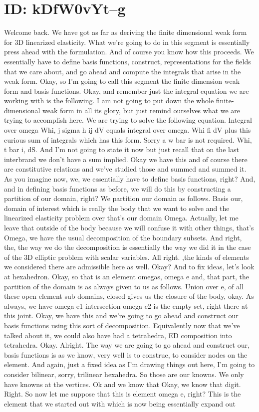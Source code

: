 \documentclass[10pt]{article}
\begin{document}
\section*{ID: kDfW0vYt--g}
Welcome back. We have got as far as deriving the finite dimensional weak form for 3D linearized elasticity. What we're going to do in this segment is essentially press ahead with the formulation. And of course you know how this proceeds. We essentially have to define basis functions, construct, representations for the fields that we care about, and go ahead and compute the integrals that arise in the weak form. Okay, so I'm going to call this segment the finite dimension weak form and basis functions. Okay, and remember just the integral equation we are working with is the following. I am not going to put down the whole finite-dimensional weak form in all its glory, but just remind ourselves what we are trying to accomplish here. We are trying to solve the following equation. Integral over omega Whi, j sigma h ij dV equals integral over omega. Whi fi dV plus this curious sum of integrals which has this form. Sorry a w bar is not required. Whi, t bar i, dS. And I'm not going to state it now but just recall that on the last interbrand we don't have a sum implied. Okay we have this and of course there are constitutive relations and we've studied those and summed and summed it. As you imagine now, we, we essentially have to define basis functions, right? And, and in defining basis functions as before, we will do this by constructing a partition of our domain, right? We partition our domain as follows. Basis our, domain of interest which is really the body that we want to solve and the linearized elasticity problem over that's our domain Omega. Actually, let me leave that outside of the body because we will confuse it with other things, that's Omega, we have the usual decomposition of the boundary subsets. And right, the, the way we do the decomposition is essentially the way we did it in the case of the 3D elliptic problem with scalar variables. All right. ,the kinds of elements we considered there are admissible here as well. Okay? And to fix ideas, let's look at hexahedron. Okay, so that is an element omegas, omega e and, that part, the partition of the domain is as always given to us as follows. Union over e, of all these open element sub domains, closed gives us the closure of the body, okay. As always, we have omega e1 intersection omega e2 is the empty set, right there at this joint. Okay, we have this and we're going to go ahead and construct our basis functions using this sort of decomposition. Equivalently now that we've talked about it, we could also have had a tetrahedra, ED composition into tetrahedra. Okay. Alright. The way we are going to go ahead and construct our, basis functions is as we know, very well is to construe, to consider nodes on the element. And again, just a fixed idea as I'm drawing things out here, I'm going to consider bilinear, sorry, trilinear hexahedra. So those are our knowns. We only have knowns at the vertices. Ok and we know that Okay, we know that digit. Right. So now let me suppose that this is element omega e, right? This is the element that we started out with which is now being essentially expand out 
\end{document}
